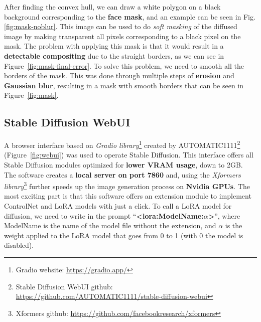 \documentclass[preprint]{elsarticle}
\begin{document}
After finding the convex hull, we can draw a white polygon on a black background corresponding to the \textbf{face mask}, 
and an example can be seen in Fig. \ref{fig:mask-noblur}. 
This image can be used to do \emph{soft masking} of the diffused image by making transparent all 
pixels corresponding to a black pixel on the mask. 
The problem with applying this mask is that it would result in a \textbf{detectable compositing} due to the straight borders, 
as we can see in Figure~\ref{fig:mask-final-error}. 
To solve this problem, we need to smooth all the borders of the mask. 
This was done through multiple steps of \textbf{erosion} and \textbf{Gaussian blur}, 
resulting in a mask with smooth borders that can be seen in Figure~\ref{fig:mask}.

\subsection{Stable Diffusion WebUI} \label{sec:stable_diffusion_webui}


A browser interface based on \emph{Gradio library}\footnote{Gradio website: \url{https://gradio.app/}} 
created by AUTOMATIC1111\footnote{Stable Diffusion WebUI github: \url{https://github.com/AUTOMATIC1111/stable-diffusion-webui}} 
(Figure~\ref{fig:webui}) 
was used to operate Stable Diffusion. 
This interface offers all Stable Diffusion modules optimized for \textbf{lower VRAM usage}, down to 2GB. 
The software creates a \textbf{local server on port 7860} and, 
using the \emph{Xformers library}\footnote{Xformers github: \url{https://github.com/facebookresearch/xformers}} 
further speeds up the image generation process on \textbf{Nvidia GPUs}.
The most exciting part is that this software offers an extension module to 
implement ControlNet and LoRA models with just a click. 
To call a LoRA model for diffusion, we need to write in the prompt ``\textbf{<lora:ModelName:$\alpha$>}'', 
where ModelName is the name of the model file without the extension, 
and $\alpha$ is the weight applied to the LoRA model that goes from 0 to 1 (with 0 the model is disabled). 
\end{document}
